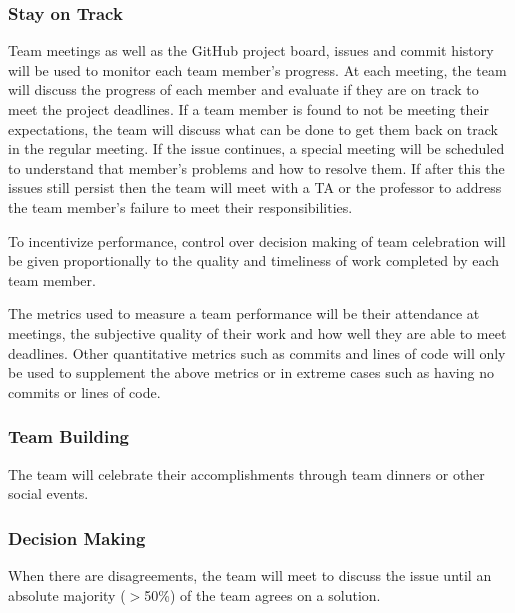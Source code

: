 \documentclass{article}
\begin{document}
\subsubsection*{Stay on Track}

Team meetings as well as the GitHub project board, issues and commit history will be used to monitor each team member's progress.
At each meeting, the team will discuss the progress of each member and evaluate if they are on track to meet the project deadlines.
If a team member is found to not be meeting their expectations, the team will discuss what can be done to get them back on track in the regular meeting.
If the issue continues, a special meeting will be scheduled to understand that member's problems and how to resolve them.
If after this the issues still persist then the team will meet with a TA or the professor to address the team member's failure to meet their responsibilities.

\noindent To incentivize performance, control over decision making of team celebration will be given proportionally to the quality and timeliness of work completed by each team member.

\noindent The metrics used to measure a team performance will be their attendance at meetings, the subjective quality of their work and how well they are able to meet deadlines.
Other quantitative metrics such as commits and lines of code will only be used to supplement the above metrics or in extreme cases such as having no commits or lines of code.
\subsubsection*{Team Building}

The team will celebrate their accomplishments through team dinners or other social events.

\subsubsection*{Decision Making} 

When there are disagreements, the team will meet to discuss the issue until an absolute majority ($>$50\%) of the team agrees on a solution.
\end{document}
